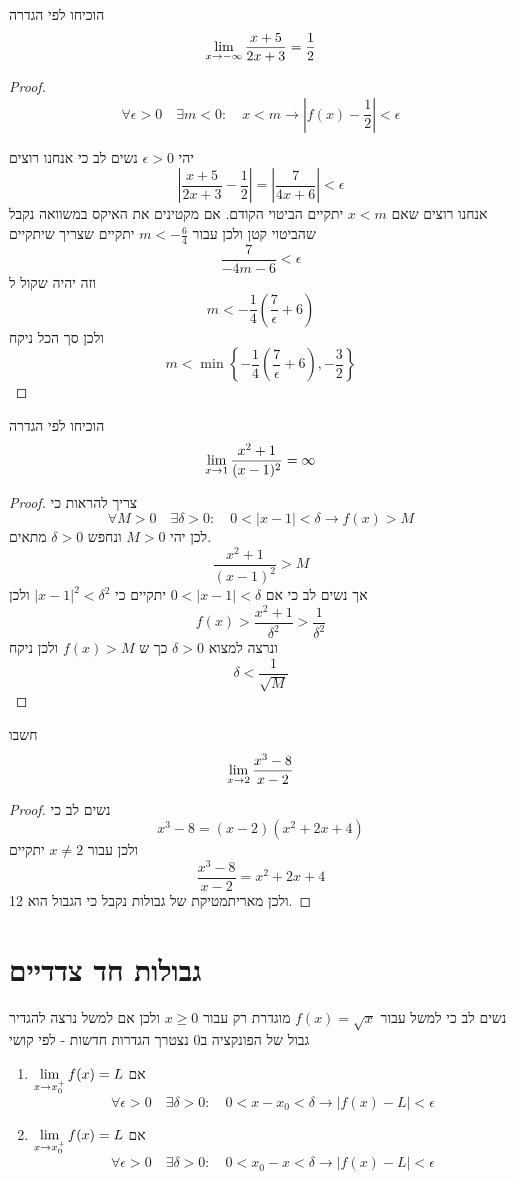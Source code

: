 \documentclass{article}
\begin{document}
\begin{exercise}
הוכיחו לפי הגדרה 
\[\underset{x\rightarrow-\infty}{\lim}\,\frac{x+5}{2x+3}=\frac{1}{2}\]
\end{exercise}

\begin{proof}
\[\forall\epsilon>0\quad \exists m<0: \quad x<m\longrightarrow\left|f(x)-\frac{1}{2}\right|<\epsilon\]

יהי 
$\epsilon>0$
נשים לב כי אנחנו רוצים 
\[\left|\frac{x+5}{2x+3}-\frac{1}{2}\right|= \left|\frac{7}{4x+6}\right|<\epsilon\]
אנחנו רוצים שאם 
$x<m$
יתקיים הביטוי הקודם. אם מקטינים את האיקס במשוואה נקבל שהביטוי קטן ולכן עבור 
$m<-\frac{6}{4}$
יתקיים שצריך שיתקיים 
\[\frac{7}{-4m-6}<\epsilon\]
וזה יהיה שקול ל 
\[m<-\frac{1}{4}\left(\frac{7}{\epsilon}+6\right)\]
ולכן סך הכל ניקח 
\[m<\min\left\{-\frac{1}{4}\left(\frac{7}{\epsilon} +6\right), -\frac{3}{2}\right\}\]
\end{proof}

\begin{exercise}
הוכיחו לפי הגדרה 
\[\underset{x\rightarrow1}{\lim}\,\frac{x^2+1}{(x-1)^2}=\infty\]
\end{exercise}

\begin{proof}
צריך להראות כי 
\[\forall M>0\quad \exists \delta>0:\quad 0<|x-1|<\delta\longrightarrow f(x)>M\]
לכן יהי 
$M>0$
ונחפש 
$\delta>0$
מתאים. 
\[\frac{x^2+1}{(x-1)^2}>M\]
אך נשים לב כי אם 
$0<|x-1|<\delta$ 
יתקיים כי 
$|x-1|^2<\delta^2$
ולכן 
\[f(x)>\frac{x^2+1}{\delta^2}>\frac{1}{\delta^2}\]
ונרצה למצוא 
$\delta>0$
כך ש 
$f(x)> M$
ולכן ניקח 
\[\delta<\frac{1}{\sqrt{M}}\]
\end{proof}

\begin{exercise}
חשבו 
\[\underset{x\rightarrow2}{\lim}\, \frac{x^3-8}{x-2}\]
\end{exercise}

\begin{proof}
נשים לב כי 
\[x^3-8 = (x-2)(x^2+2x+4)\]
ולכן עבור 
$x\neq 2$
יתקיים 
\[\frac{x^3-8}{x-2} = x^2+2x+4\]
ולכן מאריתמטיקת של גבולות נקבל כי הגבול הוא 12.
\end{proof}

\section{גבולות חד צדדיים}
נשים לב כי למשל עבור 
$f(x)=\sqrt{x}$
מוגדרת רק עבור 
$x\geq 0$
ולכן אם למשל נרצה להגדיר גבול של הפונקציה ב0 נצטרך הגדרות חדשות - לפי קושי 
\begin{enumerate}
\item 
$\underset{x\rightarrow x_0^{+}}{\lim}\,f(x) = L$
אם 
\[\forall\epsilon>0\quad\exists\delta>0:\quad 0<x-x_0<\delta\longrightarrow |f(x)-L|<\epsilon\]
\item $\underset{x\rightarrow x_0^{+}}{\lim}\,f(x) = L$
אם 
\[\forall\epsilon>0\quad\exists\delta>0:\quad 0<x_0-x<\delta\longrightarrow |f(x)-L|<\epsilon\]
\end{enumerate}
\end{document}
